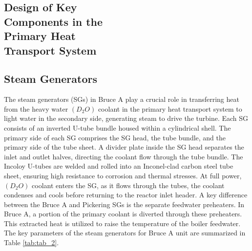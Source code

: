 \documentclass[12pt]{article}
\begin{document}
\begin{multicols}{2}

\section{Design of Key \\ Components in the \\ Primary Heat \\  Transport System}
\subsection{Steam Generators}

The steam generators (SGs) in Bruce A play a crucial role in transferring heat from the heavy water $(D_{2}O)$ coolant in the primary heat transport system to light water in the secondary side, generating steam to drive the turbine. Each SG consists of an inverted U-tube bundle housed within a cylindrical shell. The primary side of each SG comprises the SG head, the tube bundle, and the primary side of the tube sheet. A divider plate inside the SG head separates the inlet and outlet halves, directing the coolant flow through the tube bundle. The Incoloy U-tubes are welded and rolled into an Inconel-clad carbon steel tube sheet, ensuring high resistance to corrosion and thermal stresses. At full power, $(D_{2}O)$ coolant enters the SG, as it flows through the tubes, the coolant condenses and cools before returning to the reactor inlet header. A key difference between the Bruce A and Pickering SGs is the separate feedwater preheaters. In Bruce A, a portion of the primary coolant is diverted through these preheaters. This extracted heat is utilized to raise the temperature of the boiler feedwater. The key parameters of the steam generators for Bruce A unit are summarized in Table \ref{tab:tab_2}.
    
\end{multicols}
\end{document}
